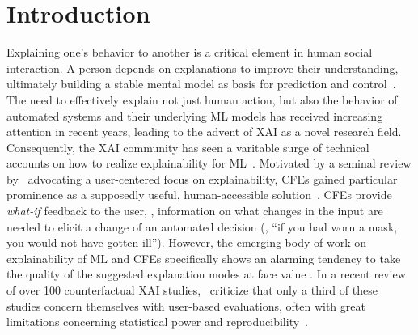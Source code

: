 \section{Introduction}\label{sec:introduction}

Explaining one's behavior to another is a critical element in human social interaction. 
A person depends on explanations to improve their understanding, ultimately building a stable mental model as basis for prediction and control~\citep{heider_psychology_1958}. 
The need to effectively explain not just human action, but also the behavior of automated systems and their underlying \gls{ML} models has received increasing attention in recent years, leading to the advent of \gls{XAI} as a novel research field.
Consequently, the \gls{XAI} community has seen a varitable surge of technical accounts on how to realize explainability for \gls{ML}~\citep{guidotti_survey_2019}. 
Motivated by a seminal review by~\citep{miller_explanation_2019} advocating a user-centered focus on explainability, \glspl{CFE} gained particular prominence as a supposedly useful, human-accessible solution~\citep{keane_if_2021}.
\glspl{CFE} provide \textit{what-if} feedback to the user, \ie, information on what changes in the input are needed to elicit a change of an automated decision (\ie, ``if you had worn a mask, you would not have gotten ill''). 
However, the emerging body of work on explainability of \gls{ML} and \glspl{CFE} specifically shows an alarming tendency to take the quality of the suggested explanation modes at face value \citep{doshi-velez_towards_2017, offert_i_2017}.
In a recent review of over 100 counterfactual XAI studies,~\citeauthor{keane_if_2021} criticize that only a third of these studies concern themselves with user-based evaluations, often with great limitations concerning statistical power and reproducibility~\citep{keane_if_2021}.
